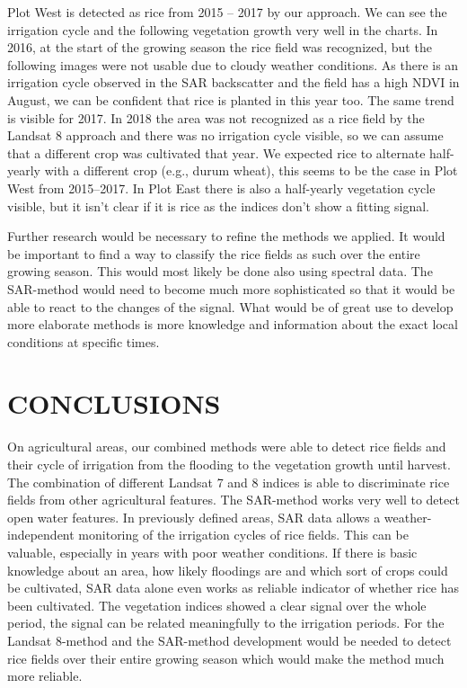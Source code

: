 \documentclass[a4paper, 10pt, conference]{ieeeconf}      %
\begin{document}
Plot West is detected as rice from 2015 – 2017 by our approach. We can see the irrigation cycle and the following vegetation growth very well in the charts. In 2016, at the start of the growing season the rice field was recognized, but the following images were not usable due to cloudy weather conditions. As there is an irrigation cycle observed in the SAR backscatter and the field has a high NDVI in August, we can be confident that rice is planted in this year too. The same trend is visible for 2017. In 2018 the area was not recognized as a rice field by the Landsat 8 approach and there was no irrigation cycle visible, so we can assume that a different crop was cultivated that year. We expected rice to alternate half-yearly with a different crop (e.g., durum wheat), this seems to be the case in Plot West from 2015–2017. In Plot East there is also a half-yearly vegetation cycle visible, but it isn’t clear if it is rice as the indices don’t show a fitting signal. 

Further research would be necessary to refine the methods we applied. It would be important to find a way to classify the rice fields as such over the entire growing season. This would most likely be done also using spectral data. The SAR-method would need to become much more sophisticated so that it would be able to react to the changes of the signal. What would be of great use to develop more elaborate methods is more knowledge and information about the exact local conditions at specific times.




\section{CONCLUSIONS}
 
On agricultural areas, our combined methods were able to detect rice fields and their  cycle of irrigation from the flooding to the vegetation growth until harvest. The combination of different Landsat 7 and 8 indices is able to discriminate rice fields from other agricultural features. The SAR-method works very well to detect open water features. In previously defined areas, SAR data allows a weather-independent monitoring of the irrigation cycles of rice fields. This can be valuable, especially in years with poor weather conditions.  If there is basic knowledge about an area, how likely floodings are and which sort of crops could be cultivated, SAR data alone even works as reliable indicator of whether rice has been cultivated. The vegetation indices showed a clear signal over the whole period, the signal can be related meaningfully to the irrigation periods. For the Landsat 8-method and the SAR-method development would be needed to detect rice fields over their entire growing season which would make the method much more reliable.
\end{document}
